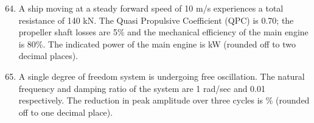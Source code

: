 \documentclass[journal]{IEEEtran}
\theoremstyle{remark}
\begin{document}
\begin{enumerate}[itemsep=1em]
\setcounter{enumi}{63}
\item A ship moving at a steady forward speed of 10 m/s experiences a total resistance of 140 kN. The Quasi Propulsive Coefficient (QPC) is 0.70; the propeller shaft losses are 5\% and the mechanical efficiency of the main engine is 80\%. The indicated power of the main engine is \underline{\hspace{2cm}} kW (rounded off to two decimal places). 
\end{enumerate}

\begin{enumerate}[itemsep=1em]
\setcounter{enumi}{64}
\item A single degree of freedom system is undergoing free oscillation. The natural frequency and damping ratio of the system are 1 rad/sec and 0.01 respectively. The reduction in peak amplitude over three cycles is \underline{\hspace{2cm}} \% (rounded off to one decimal place).
\end{enumerate}
\end{document}
